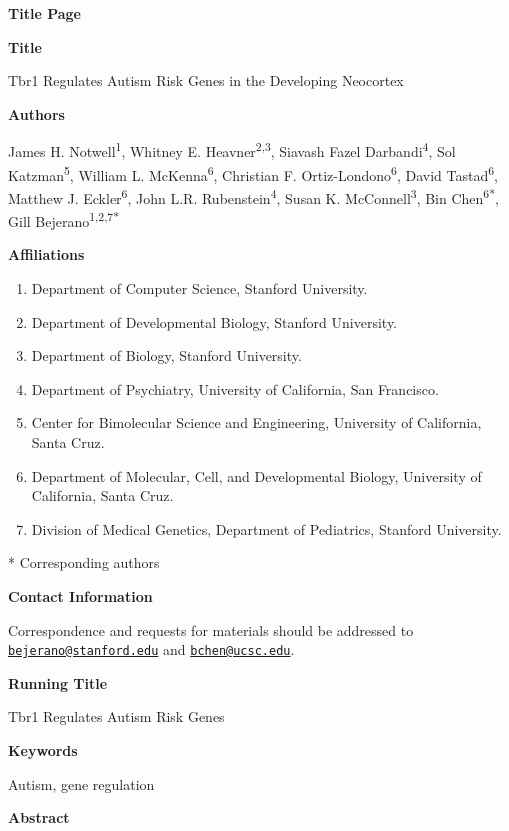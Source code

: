 \documentclass[]{article}
\date{}
\begin{document}
\textbf{Title Page}

\textbf{Title}

Tbr1 Regulates Autism Risk Genes in the Developing Neocortex

\textbf{Authors}

James H. Notwell\textsuperscript{1}, Whitney E.
Heavner\textsuperscript{2,3}, Siavash Fazel Darbandi\textsuperscript{4},
Sol Katzman\textsuperscript{5}, William L. McKenna\textsuperscript{6},
Christian F. Ortiz-Londono\textsuperscript{6}, David
Tastad\textsuperscript{6}, Matthew J. Eckler\textsuperscript{6}, John
L.R. Rubenstein\textsuperscript{4}, Susan K.
McConnell\textsuperscript{3}, Bin Chen\textsuperscript{6*}, Gill
Bejerano\textsuperscript{1,2,7*}

\textbf{Affiliations}

\begin{enumerate}
\def\labelenumi{\arabic{enumi}.}
\item
  Department of Computer Science, Stanford University.
\item
  Department of Developmental Biology, Stanford University.
\item
  Department of Biology, Stanford University.
\item
  Department of Psychiatry, University of California, San Francisco.
\item
  Center for Bimolecular Science and Engineering, University of
  California, Santa Cruz.
\item
  Department of Molecular, Cell, and Developmental Biology, University
  of California, Santa Cruz.
\item
  Division of Medical Genetics, Department of Pediatrics, Stanford
  University.
\end{enumerate}

* Corresponding authors

\textbf{Contact Information}

Correspondence and requests for materials should be addressed to
\href{mailto:bejerano@stanford.edu}{\nolinkurl{bejerano@stanford.edu}}
and \href{mailto:bchen@ucsc.edu}{\nolinkurl{bchen@ucsc.edu}}.

\textbf{Running Title}

Tbr1 Regulates Autism Risk Genes

\textbf{Keywords}

Autism, gene regulation

\textbf{Abstract}
\end{document}
